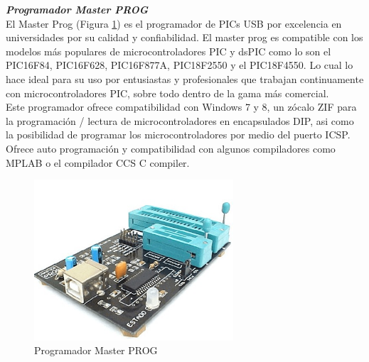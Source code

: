 \documentclass[12pt,a4paper]{article}
\begin{document}
   \textbf{\textit{Programador Master PROG}}\\
   El Master Prog (Figura \ref{fig:MASTER}) es el programador de PICs USB por excelencia en universidades por su calidad y confiabilidad. El master prog es compatible con los modelos más populares de microcontroladores PIC y dsPIC como lo son el PIC16F84, PIC16F628, PIC16F877A, PIC18F2550 y el PIC18F4550. Lo cual lo hace ideal para su uso por entusiastas y profesionales que trabajan continuamente con microcontroladores PIC, sobre todo dentro de la gama más comercial.\\
   Este programador ofrece compatibilidad con Windows 7 y 8, un zócalo ZIF para la programación / lectura de microcontroladores en encapsulados DIP, asi como la posibilidad de programar los microcontroladores por medio del puerto ICSP. Ofrece auto programación y compatibilidad con algunos compiladores como MPLAB o el compilador CCS C compiler.
   
   \begin{figure}[htpb]
   \centering
   \includegraphics[height=6cm]{MASTERPROG}
   \caption{Programador Master PROG}
   \label{fig:MASTER}
   \end{figure}
   \newpage
   \renewcommand{\figurename}{Figura 3.}
   \setcounter{figure}{0}
    \renewcommand{\tablename}{Tabla 3.}
   \setcounter{table}{0}
\end{document}

